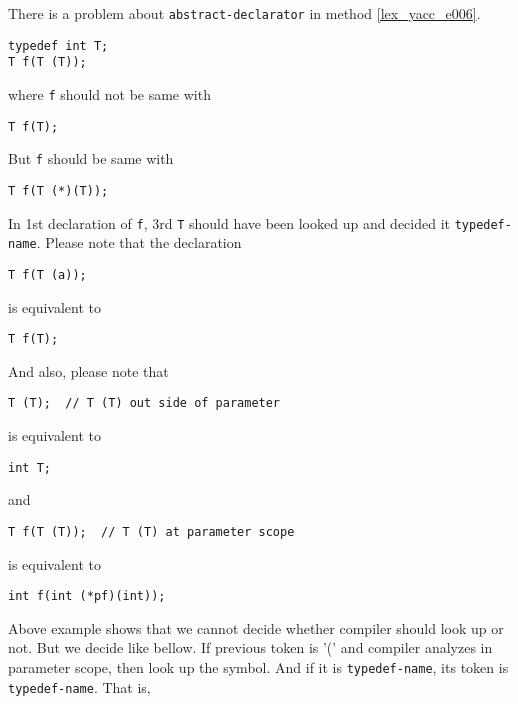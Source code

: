 There is a problem about {\tt{abstract-declarator}}
in method \ref{lex_yacc_e006}.
\begin{verbatim}
typedef int T;
T f(T (T));
\end{verbatim}
where {\tt{f}} should not be same with
\begin{verbatim}
T f(T);
\end{verbatim}
But {\tt{f}} should be same with
\begin{verbatim}
T f(T (*)(T));
\end{verbatim}
In 1st declaration of {\tt{f}}, 3rd {\tt{T}} should have been
looked up and decided it {\tt{typedef-name}}.
Please note that the declaration
\begin{verbatim}
T f(T (a));
\end{verbatim}
is equivalent to
\begin{verbatim}
T f(T);
\end{verbatim}
And also, please note that
\begin{verbatim}
T (T);  // T (T) out side of parameter
\end{verbatim}
is equivalent to
\begin{verbatim}
int T;
\end{verbatim}
and
\begin{verbatim}
T f(T (T));  // T (T) at parameter scope
\end{verbatim}
is equivalent to
\begin{verbatim}
int f(int (*pf)(int));
\end{verbatim}

Above example shows that
we cannot decide whether compiler should look up or not.
But we decide like bellow.
If previous token is '(' and compiler analyzes
in parameter scope, then look up the symbol. And
if it is {\tt{typedef-name}}, its token is {\tt{typedef-name}}.
That is,

